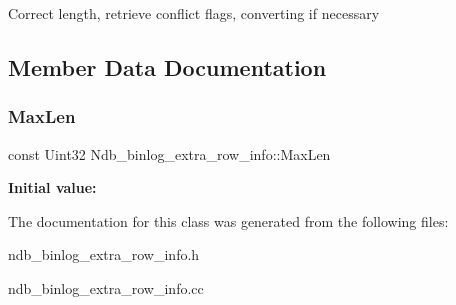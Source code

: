 Correct length, retrieve conflict flags, converting if necessary

\subsection{Member Data Documentation}
\mbox{\label{classNdb__binlog__extra__row__info_a9247b130b51b5f431c742886937ff405}} 
\subsubsection{\texorpdfstring{Max\+Len}{MaxLen}}
{\footnotesize\ttfamily const Uint32 Ndb\+\_\+binlog\+\_\+extra\+\_\+row\+\_\+info\+::\+Max\+Len\hspace{0.3cm}{\ttfamily [static]}}

{\bfseries Initial value\+:}
\begin{DoxyCode}{0}
\DoxyCodeLine{=}
\end{DoxyCode}


The documentation for this class was generated from the following files\+:\begin{DoxyCompactItemize}
\item 
ndb\+\_\+binlog\+\_\+extra\+\_\+row\+\_\+info.\+h\item 
ndb\+\_\+binlog\+\_\+extra\+\_\+row\+\_\+info.\+cc\end{DoxyCompactItemize}
